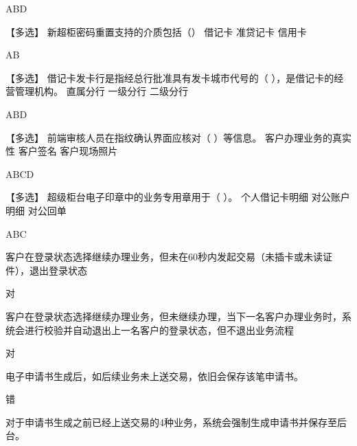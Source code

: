 \documentclass[kindlepaper]{BHCexam4kindle}
\begin{document}
\begin{questions}
\begin{solution} ABD \end{solution}
\qs 【多选】 新超柜密码重置支持的介质包括（） \xx
{} {  借记卡 } { 准贷记卡 } { 信用卡 }
\begin{solution} AB \end{solution}
\qs 【多选】 借记卡发卡行是指经总行批准具有发卡城市代号的（   ），是借记卡的经营管理机构。 \xx
{} {  直属分行 } { 一级分行 } { 二级分行 }
\begin{solution} ABD \end{solution}
\qs 【多选】 前端审核人员在指纹确认界面应核对（  ）等信息。 \xx
{} {  客户办理业务的真实性 } { 客户签名 } { 客户现场照片 }
\begin{solution} ABCD \end{solution}
\qs 【多选】 超级柜台电子印章中的业务专用章用于（  ）。 \xx
{} {  个人借记卡明细 } { 对公账户明细 } { 对公回单 }
\begin{solution} ABC \end{solution}
\qs 客户在登录状态选择继续办理业务，但未在60秒内发起交易（未插卡或未读证件），退出登录状态 \xx
\begin{solution} 对 \end{solution}
\qs 客户在登录状态选择继续办理业务，但未继续办理，当下一名客户办理业务时，系统会进行校验并自动退出上一名客户的登录状态，但不退出业务流程 \xx
\begin{solution} 对 \end{solution}
\qs 电子申请书生成后，如后续业务未上送交易，依旧会保存该笔申请书。 \xx
\begin{solution} 错 \end{solution}
\qs 对于申请书生成之前已经上送交易的4种业务，系统会强制生成申请书并保存至后台。 \xx

\end{questions}
\end{document}
